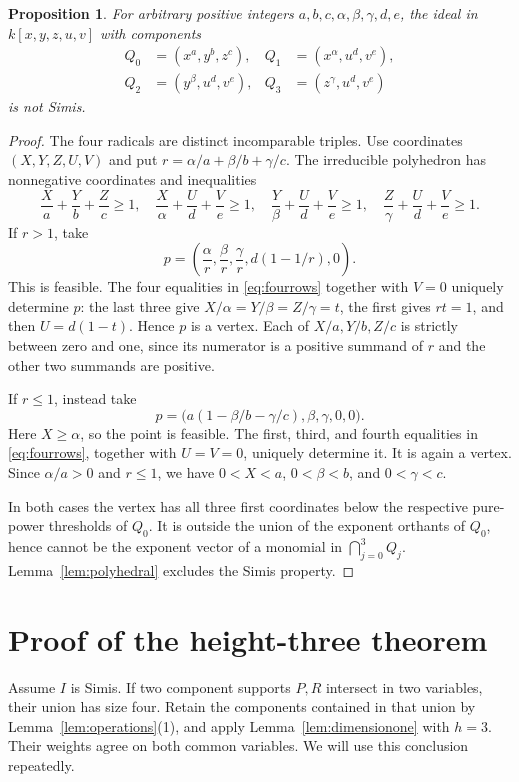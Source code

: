 \documentclass[11pt]{article}
\newtheorem{proposition}[theorem]{Proposition}
\begin{document}
\begin{proposition}\label{prop:four}
For arbitrary positive integers $a,b,c,\alpha,\beta,\gamma,d,e$,
the ideal in $k[x,y,z,u,v]$ with components
\begin{align*}
 Q_0&=(x^a,y^b,z^c),& Q_1&=(x^\alpha,u^d,v^e),\\
 Q_2&=(y^\beta,u^d,v^e),& Q_3&=(z^\gamma,u^d,v^e)
\end{align*}
is not Simis.
\end{proposition}
\begin{proof}
The four radicals are distinct incomparable triples. Use coordinates
$(X,Y,Z,U,V)$ and put
$r=\alpha/a+\beta/b+\gamma/c$. The irreducible polyhedron has
nonnegative coordinates and inequalities
\begin{equation}\label{eq:fourrows}
 \frac Xa+\frac Yb+\frac Zc\geq1,\quad
 \frac X\alpha+\frac Ud+\frac Ve\geq1,\quad
 \frac Y\beta+\frac Ud+\frac Ve\geq1,\quad
 \frac Z\gamma+\frac Ud+\frac Ve\geq1.
\end{equation}
If $r>1$, take
\[
 p=\left(\frac\alpha r,\frac\beta r,\frac\gamma r,
                  d(1-1/r),0\right).
\]
This is feasible. The four equalities in \eqref{eq:fourrows}
together with $V=0$ uniquely determine $p$: the last three give
$X/\alpha=Y/\beta=Z/\gamma=t$, the first gives $rt=1$, and then
$U=d(1-t)$. Hence $p$ is a vertex. Each of
$X/a,Y/b,Z/c$ is strictly between zero and one, since its numerator
is a positive summand of $r$ and the other two summands are positive.

If $r\leq1$, instead take
\[
 p=\bigl(a(1-\beta/b-\gamma/c),\beta,\gamma,0,0\bigr).
\]
Here $X\geq\alpha$, so the point is feasible. The first, third, and
fourth equalities in \eqref{eq:fourrows}, together with $U=V=0$,
uniquely determine it. It is again a vertex. Since $\alpha/a>0$
and $r\leq1$, we have
$0<X<a$, $0<\beta<b$, and $0<\gamma<c$.

In both cases the vertex has all three first coordinates below the
respective pure-power thresholds of $Q_0$. It is outside the union
of the exponent orthants of $Q_0$, hence cannot be the exponent
vector of a monomial in $\bigcap_{j=0}^3Q_j$.
Lemma~\ref{lem:polyhedral} excludes the Simis property.
\end{proof}

\section{Proof of the height-three theorem}
Assume $I$ is Simis. If two component supports $P,R$ intersect in
two variables, their union has size four. Retain the components
contained in that union by Lemma~\ref{lem:operations}(1), and apply
Lemma~\ref{lem:dimensionone} with $h=3$. Their weights agree on
both common variables. We will use this conclusion repeatedly.
\end{document}
